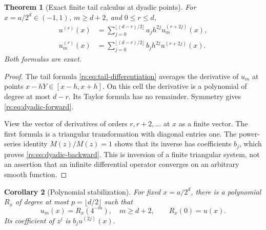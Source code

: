 \documentclass[11pt,a4paper,oneside,openany]{book}
\numberwithin{equation}{chapter}
\newtheorem{theorem}{Theorem}[chapter]
\newtheorem{corollary}[theorem]{Corollary}
\theoremstyle{definition}
\theoremstyle{remark}
\begin{document}
\begin{theorem}[Exact finite tail calculus at dyadic points]\label{rs:thm:dyadic}
For $x=a/2^d\in(-1,1)$, $m\geq d+2$, and $0\leq r\leq d$,
\begin{align}
 u^{(r)}(x)&=\sum_{j=0}^{\lfloor(d-r)/2\rfloor}
           a_jh^{2j}u_m^{(r+2j)}(x),\label{rs:eq:dyadic-forward}\\
 u_m^{(r)}(x)&=\sum_{j=0}^{\lfloor(d-r)/2\rfloor}
           b_jh^{2j}u^{(r+2j)}(x).\label{rs:eq:dyadic-backward}
\end{align}
Both formulas are exact.
\end{theorem}
\begin{proof}
The tail formula \eqref{rs:eq:tail-differentiation} averages the derivative
of $u_m$ at points $x-hY\in[x-h,x+h]$. On this cell the derivative
is a polynomial of degree at most $d-r$. Its Taylor formula has no
remainder. Symmetry gives \eqref{rs:eq:dyadic-forward}.

View the vector of derivatives of orders $r,r+2,\ldots$ at $x$ as a
finite vector. The first formula is a triangular transformation with
diagonal entries one. The power-series identity $M(z)/M(z)=1$
shows that its inverse has coefficients $b_j$, which proves
\eqref{rs:eq:dyadic-backward}. This is inversion of a finite triangular
system, not an assertion that an infinite differential operator
converges on an arbitrary smooth function.
\end{proof}

\begin{corollary}[Polynomial stabilization]\label{rs:cor:poly-stabilize}
For fixed $x=a/2^d$, there is a polynomial $R_x$ of degree at most
$p=\lfloor d/2\rfloor$ such that
\begin{equation}
 u_m(x)=R_x(4^{-m}),\quad m\geq d+2,
 \qquad R_x(0)=u(x).
 \label{rs:eq:exact-poly}
\end{equation}
Its coefficient of $z^j$ is $b_ju^{(2j)}(x)$.
\end{corollary}
\end{document}
